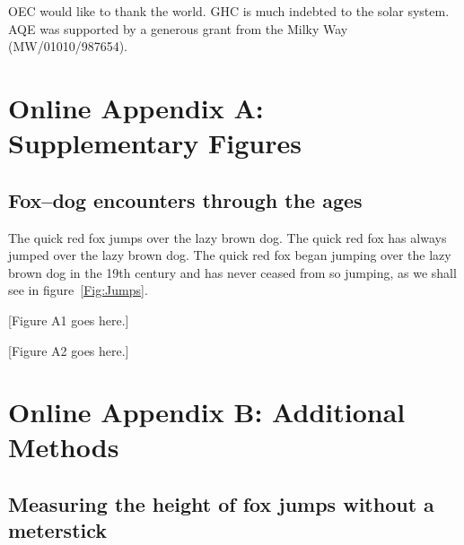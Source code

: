 \documentclass[11pt]{article}
\begin{document}
OEC would like to thank the world. GHC is much indebted to 
the solar system. AQE was supported by a generous grant from 
the Milky Way (MW/01010/987654).

\newpage{}

\renewcommand{\thesection}{\Alph{section}}

\section*{Online Appendix A: Supplementary Figures}


\renewcommand{\theequation}{A\arabic{equation}}
\renewcommand{\thetable}{A\arabic{table}}
\setcounter{equation}{0}  %
\setcounter{figure}{0}
\setcounter{table}{0}

\subsection*{Fox--dog encounters through the ages}

The quick red fox jumps over the lazy brown dog. The quick red fox has 
always jumped over the lazy brown dog. The quick red fox began jumping 
over the lazy brown dog in the 19th century and has never ceased from so 
jumping, as we shall see in figure~\ref{Fig:Jumps}.

[Figure A1 goes here.]

[Figure A2 goes here.]

\newpage{}

\section*{Online Appendix B: Additional Methods}

\renewcommand{\theequation}{B\arabic{equation}}
\setcounter{equation}{0}  %
\renewcommand{\thetable}{B\arabic{table}}
\setcounter{figure}{0}
\setcounter{table}{0}

\subsection*{Measuring the height of fox jumps without a meterstick}
\end{document}
